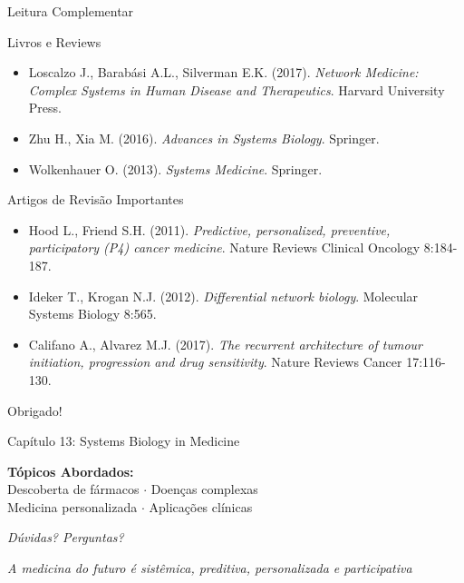 \begin{frame}{Leitura Complementar}
\begin{block}{Livros e Reviews}
\begin{itemize}
    \item Loscalzo J., Barabási A.L., Silverman E.K. (2017). \textit{Network Medicine: Complex Systems in Human Disease and Therapeutics}. Harvard University Press.
    \item Zhu H., Xia M. (2016). \textit{Advances in Systems Biology}. Springer.
    \item Wolkenhauer O. (2013). \textit{Systems Medicine}. Springer.
\end{itemize}
\end{block}

\begin{block}{Artigos de Revisão Importantes}
\begin{itemize}
    \item Hood L., Friend S.H. (2011). \textit{Predictive, personalized, preventive, participatory (P4) cancer medicine}. Nature Reviews Clinical Oncology 8:184-187.
    \item Ideker T., Krogan N.J. (2012). \textit{Differential network biology}. Molecular Systems Biology 8:565.
    \item Califano A., Alvarez M.J. (2017). \textit{The recurrent architecture of tumour initiation, progression and drug sensitivity}. Nature Reviews Cancer 17:116-130.
\end{itemize}
\end{block}
\end{frame}

\begin{frame}
\begin{center}
{\Huge Obrigado!}

\vspace{1cm}

{\Large Capítulo 13: Systems Biology in Medicine}

\vspace{1cm}

\textbf{Tópicos Abordados:}\\
Descoberta de fármacos $\cdot$ Doenças complexas\\
Medicina personalizada $\cdot$ Aplicações clínicas

\vspace{1cm}

\textit{Dúvidas? Perguntas?}

\vspace{0.5cm}

\textit{A medicina do futuro é sistêmica, preditiva, personalizada e participativa}
\end{center}
\end{frame}


